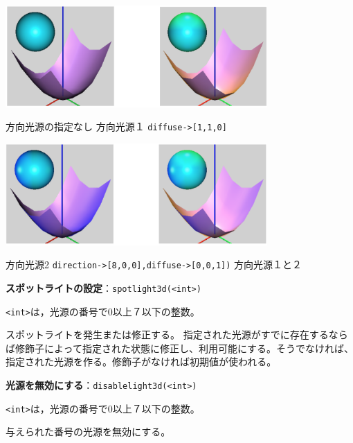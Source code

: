 \documentclass[papersize,a4paper,12pt,uplatex]{jsarticle}
\begin{document}
\vspace{\baselineskip}
 

\vspace{\baselineskip}
\hspace{15mm} \includegraphics[bb=0 0 549 213 , width=10cm]{Cfig/direclight1.png}

\hspace{20mm}方向光源の指定なし \hspace{20mm} 方向光源１ \verb|diffuse->[1,1,0]|

\vspace{\baselineskip}
\hspace{15mm} \includegraphics[bb=0 0 550 214 , width=10cm]{Cfig/direclight2.png}

\hspace{2mm}方向光源2 \verb|direction->[8,0,0],diffuse->[0,0,1])| \hspace{5mm} 方向光源１と２

\hypertarget{spotlight3d}{} 
\vspace{\baselineskip}
\noindent
{\bf スポットライトの設定}：\verb|spotlight3d(<int>)|

\verb|<int>|は，光源の番号で0以上７以下の整数。

スポットライトを発生または修正する。 指定された光源がすでに存在するならば修飾子によって指定された状態に修正し、利用可能にする。そうでなければ、指定された光源を作る。修飾子がなければ初期値が使われる。

\vspace{\baselineskip}
 

\hypertarget{disablelight3d}{}
\vspace{\baselineskip}
\noindent
{\bf 光源を無効にする}：\verb|disablelight3d(<int>)|

\verb|<int>|は，光源の番号で0以上７以下の整数。

与えられた番号の光源を無効にする。

 
\end{document}
